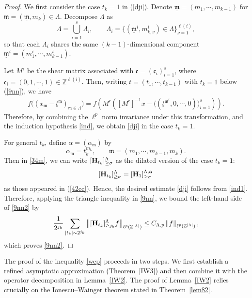 \documentclass[10pt,a4paper]{amsart}
\numberwithin{equation}{section}
\begin{document}
\begin{proof}
We first consider the case $t_k=1$ in (\ref{dji}).
Denote $\underline{\mathfrak{m}}=(m_1,\cdots,m_{k-1})$ for $\mathfrak{m}=(\underline{\mathfrak{m}},m_k)\in \Lambda$. 
Decompose $\Lambda$ as
\[
\Lambda=\bigcup_{i=1}^s\Lambda_i,
\qquad
\Lambda_i=\{(\underline{\mathfrak{m}}^i,m_{k,\nu}^i)\in \Lambda\}_{\nu=1}^{\ell(i)},
\]
so that each $\Lambda_i$ shares the same $(k-1)$-dimensional component $\underline{\mathfrak{m}}^i=(m_1^{i},\cdots,m_{k-1}^{i})$.

Let $M^{\mathfrak{c}}$ be the shear matrix associated with $\mathfrak{c}=(\mathfrak{c}_i)_{i=1}^s$, where $\mathfrak{c}_i=(0,1,\cdots,1)\in \mathbb{Z}^{\ell(i)}$. Then,  writing $\underline{t}=(t_1,\cdots,t_{k-1})$ with $t_k=1$ below  (\ref{9nn}), we have
\begin{align*}
f\big((x_{\mathfrak{m}}- \underline{t}^{\underline{\mathfrak{m}}})_{\mathfrak{m}\in \Lambda}\big)
=
f\!\left(
M^{\mathfrak{c}}\!\left(
[M^{\mathfrak{c}}]^{-1}x
-
\big((\underline{t}^{\underline{\mathfrak{m}}^i},0,\cdots,0)\big)_{i=1}^s
\right)
\right).
\end{align*}
Therefore,  by combining the $\ell^p$ norm invariance   under this transformation, and  the induction hypothesis \eqref{ind}, we obtain \eqref{dji} in the case $t_k=1$.

For general $t_k$, define $\alpha=(\alpha_{\mathfrak{m}})$ by
\[
\alpha_{\mathfrak{m}}=t_k^{m_k}, \qquad \mathfrak{m}=(m_1,\cdots,m_{k-1},m_k).
\]
 Then in \eqref{34m}, we can write  $[{\bf H}_{t_k}]^{\Lambda}_{\ge \sigma}$ as the dilated version of the case $t_k=1$:
\[
[{\bf H}_{t_k}]^{\Lambda}_{\ge \sigma}
=
[{\bf H}_{1}]^{\Lambda,\alpha}_{\ge \sigma}
\]
as those appeared in   (\ref{42cc}).
Hence, the desired estimate \eqref{dji} follows from \eqref{ind1}.
Therefore, applying the triangle inequality in \eqref{9nn}, we bound the left-hand side of \eqref{9nn2} by
\[
\frac{1}{2^{j_k}} \sum_{|t_k|\sim 2^{j_k}}
\left\| [{\bf H}_{t_k}]^{\Lambda}_{\ge j_k}f\right\|_{\ell^p(\mathbb{Z}^{|\Lambda|})}
\le
C_{\Lambda,p}\left\| f\right\|_{\ell^p(\mathbb{Z}^{|\Lambda|})},
\]
which proves \eqref{9nn2}.
\end{proof}



 The proof of the inequality \eqref{wep} proceeds in two steps. We first establish a refined asymptotic approximation (Theorem~\ref{IW3}) and then combine it with the operator decomposition in Lemma~\ref{IW2}. 
The proof of Lemma~\ref{IW2} relies crucially on the Ionescu--Wainger theorem stated in Theorem~\ref{lem82}.
\end{document}
